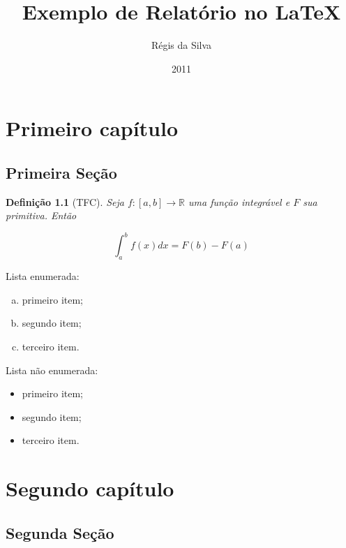 \documentclass[a4paper]{report} %
\title{Exemplo de Relat\'orio no \LaTeX}
\author{R\'egis da Silva}
\date{2011}    %
\newtheorem{defn}[teo]{Defini\c{c}\~ao} %
\newcommand{\R}{\mathbb{R}} %
\begin{document}
\maketitle  %

\tableofcontents %
\chapter{Primeiro cap\'itulo}
\label{chap_primeiro} %

\section{Primeira Se\c c\~ao}
\label{sec_primeiro}

\begin{defn}[TFC]
Seja $f:[a,b] \to \R$ uma fun\c c\~ao integr\'avel e $F$ sua primitiva. Ent\~ao

\[
  \int_a^b {f(x)dx}  = F(b) - F(a)
\]
\end{defn}

Lista enumerada:

\begin{enumerate}[a)]
 \item primeiro item;
 \item segundo item;
 \item terceiro item.
\end{enumerate}

Lista n\~ao enumerada:

\begin{itemize}
 \item primeiro item;
 \item segundo item;
 \item terceiro item.
\end{itemize}

\chapter{Segundo cap\'itulo}
\label{chap_segundo}

\section{Segunda Se\c c\~ao}
\label{sec_segundo}
\end{document}
